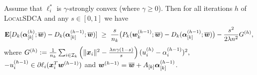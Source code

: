 \documentclass{article} %
\newcommand{\localSDCA}{\textsc{LocalSDCA}\xspace}
\begin{document}
\begin{lemma}\label{lem:sdcaStep}
Assume that $\ell^*_i$ is $\gamma$-strongly convex (where $\gamma\geq0$). Then for all iterations $h$ of \localSDCA and any $s\in[0,1]$ we have
\begin{equation}\label{eq:asfavfawefvgwgea}
\operatorname*{\mathbf{E}}[ D_k (  \bm{\alpha}_{[k]}^{(h)}; \overline{{\bm{w}}})
 -
 D_k (  \bm{\alpha}_{[k]}^{(h-1)}; \overline{{\bm{w}}})]
 \ \geq\  \frac{s}{n_k}
 \big(P_k (  {\bm{w}}_k^{(h-1)}; \overline{{\bm{w}}})
 -
  D_k (  \bm{\alpha}_{[k]}^{(h-1)}; \overline{{\bm{w}}}) \big)
   -
\frac{s^2}{2\lambda n^2}
G^{(h)},
\end{equation}
 where
$
G^{(h)} := \frac{1}{n_k}
 \sum_{i \in \mathcal{I}_k}
 \left(
  \|     \bm{x}_i\|^2 -
   \frac{ \lambda n  \gamma(1-s)}{s}
 \right)
  (u_i^{(h)}- \alpha_i^{(h-1)})^2, $~
    $-u_i^{(h-1)} \in \partial \ell_i(\bm{x}_i^T {\bm{w}}^{(h-1)})$
  and
  ${\bm{w}}^{(h-1)} = \overline{{\bm{w}}} + A_{[k]}\bm{\alpha}_{[k]}^{(h-1)}  $.
\end{lemma}
\end{document}
